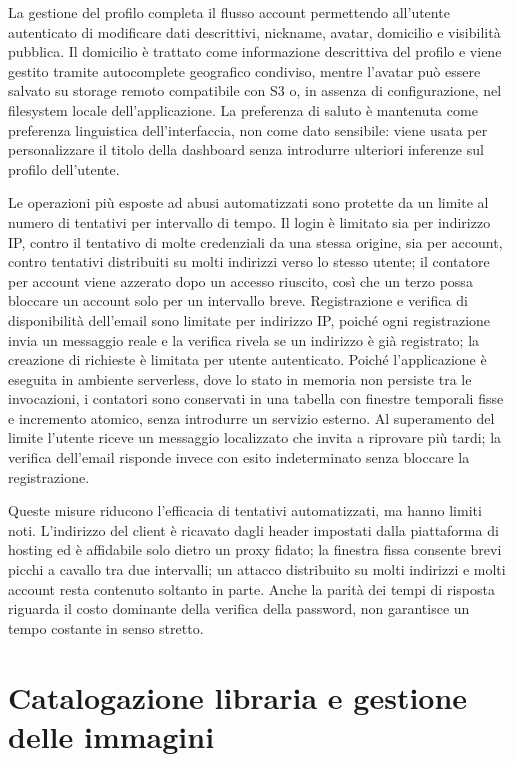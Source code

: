 La gestione del profilo completa il flusso account permettendo all'utente autenticato di modificare dati descrittivi, nickname, avatar, domicilio e visibilità pubblica. Il domicilio è trattato come informazione descrittiva del profilo e viene gestito tramite autocomplete geografico condiviso, mentre l'avatar può essere salvato su storage remoto compatibile con S3 o, in assenza di configurazione, nel filesystem locale dell'applicazione. La preferenza di saluto è mantenuta come preferenza linguistica dell'interfaccia, non come dato sensibile: viene usata per personalizzare il titolo della dashboard senza introdurre ulteriori inferenze sul profilo dell'utente.

Le operazioni più esposte ad abusi automatizzati sono protette da un limite al numero di tentativi per intervallo di tempo. Il login è limitato sia per indirizzo IP, contro il tentativo di molte credenziali da una stessa origine, sia per account, contro tentativi distribuiti su molti indirizzi verso lo stesso utente; il contatore per account viene azzerato dopo un accesso riuscito, così che un terzo possa bloccare un account solo per un intervallo breve. Registrazione e verifica di disponibilità dell'email sono limitate per indirizzo IP, poiché ogni registrazione invia un messaggio reale e la verifica rivela se un indirizzo è già registrato; la creazione di richieste è limitata per utente autenticato. Poiché l'applicazione è eseguita in ambiente serverless, dove lo stato in memoria non persiste tra le invocazioni, i contatori sono conservati in una tabella \postgresql{} con finestre temporali fisse e incremento atomico, senza introdurre un servizio esterno. Al superamento del limite l'utente riceve un messaggio localizzato che invita a riprovare più tardi; la verifica dell'email risponde invece con esito indeterminato senza bloccare la registrazione.

Queste misure riducono l'efficacia di tentativi automatizzati, ma hanno limiti noti. L'indirizzo del client è ricavato dagli header impostati dalla piattaforma di hosting ed è affidabile solo dietro un proxy fidato; la finestra fissa consente brevi picchi a cavallo tra due intervalli; un attacco distribuito su molti indirizzi e molti account resta contenuto soltanto in parte. Anche la parità dei tempi di risposta riguarda il costo dominante della verifica della password, non garantisce un tempo costante in senso stretto.

\section{Catalogazione libraria e gestione delle immagini}
\label{sec:implementazione-catalogazione}

